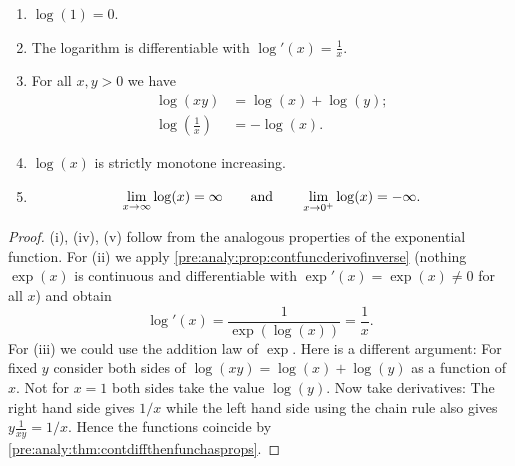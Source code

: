 \documentclass[10pt, a4paper]{article}
\begin{document}
\begin{theorem}
    \begin{enumerate}[label = (\roman*)]
        \item $\log(1) = 0$.
        \item The logarithm is differentiable with $\log'(x) = \frac{1}{x}$.
        \item For all $x, y > 0$ we have
        \begin{align*}
            \log(xy) &= \log(x) + \log(y); \\
            \log\left(\frac{1}{x}\right) &= -\log(x).
        \end{align*}
        \item $\log(x)$ is strictly monotone increasing.
        \item
        \[
        \liminfty[x]\log(x) = \infty\qquad\text{and}\qquad\lim_{x \rightarrow 0 ^ {+}}\log(x) = -\infty.
        \]
    \end{enumerate}
    \begin{proof}
        (i),
        (iv),
        (v) follow from the analogous properties of the exponential function.
        For (ii) we apply \autoref{pre:analy:prop:contfuncderivofinverse}
        (nothing $\exp(x)$ is continuous and differentiable with $\exp'(x) = \exp(x) \neq 0$ for all $x$)
        and obtain
        \[
        \log'(x) = \frac{1}{\exp(\log(x))} = \frac{1}{x}.
        \]
        For
        (iii)
        we could use the addition law of $\exp$.
        Here is a different argument:
        For fixed $y$ consider both sides of $\log(xy) = \log(x) + \log(y)$ as a function of $x$.
        Not for $x = 1$ both sides take the value $\log(y)$.
        Now take derivatives:
        The right hand side gives $1 / x$ while the left hand side using the chain rule also gives $y\frac{1}{xy} = 1 / x$.
        Hence the functions coincide by \autoref{pre:analy:thm:contdiffthenfunchasprops}.
    \end{proof}
\end{theorem}
\end{document}
